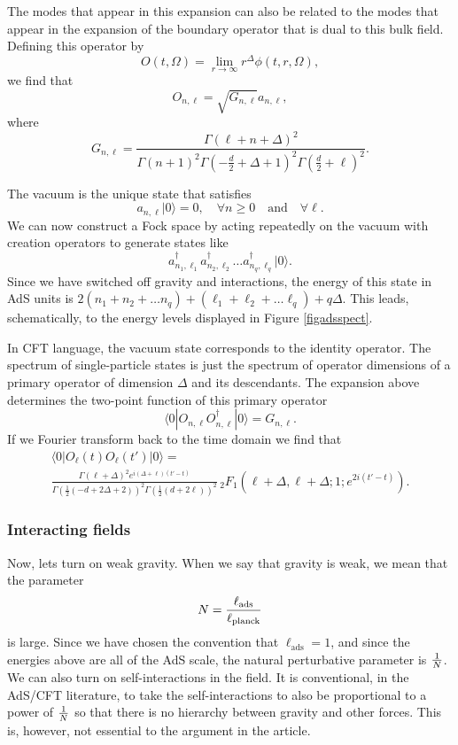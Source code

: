 \documentclass[12pt]{article}
\newcommand{\be}{\begin{equation}}
\newcommand{\ee}{\end{equation}}
\begin{document}
The modes that appear in this expansion can also be related to the modes that appear in the expansion of the boundary operator that is dual to this bulk field. Defining this operator by
\be
O(t, \Omega) = \lim_{r \rightarrow \infty} r^{\Delta} \phi(t, r, \Omega),
\ee
we find that
\be
O_{n, \ell} = \sqrt{G_{n, \ell}} a_{n, \ell},
\ee
where
\be
G_{n, \ell} = \frac{\Gamma (\ell+n+\Delta )^2}{\Gamma (n+1)^2 \Gamma \left(-\frac{d}{2}+\Delta +1\right)^2 \Gamma \left(\frac{d}{2}+\ell\right)^2}.
\ee


The vacuum is the unique state that satisfies
\be
a_{n, \ell} | 0 \rangle = 0, \quad \forall n \geq 0 \quad \text{and} \quad \forall \ell.
\ee
We can now construct a Fock space  by acting repeatedly on the vacuum
with creation operators to generate states like
\[
a_{n_1, \ell_1}^{\dagger} a_{n_2, \ell_2}^{\dagger} \ldots a_{n_q, \ell_q}^{\dagger} | 0 \rangle.
\]
Since we have switched off gravity and interactions, the energy of this state in AdS units is   $2 (n_1 + n_2 + \ldots n_q) + (\ell_1 + \ell_2 + \ldots \ell_q) + q \Delta$. This leads, schematically, to the energy levels displayed in Figure \ref{figadsspect}.

In CFT language, the vacuum state corresponds to the identity operator. The spectrum of single-particle states is just the spectrum of operator dimensions of a primary operator of dimension $\Delta$ and its descendants. The expansion above determines the two-point function of this primary operator
\be
\langle 0| O_{n, \ell} O_{n, \ell}^{\dagger} | 0 \rangle = G_{n, \ell}.
\ee
If we Fourier transform back to the time domain we find that
\begin{multline}
\langle 0| O_{\ell}(t) O_{\ell}(t') | 0 \rangle = \\
\frac{\Gamma (\ell+\Delta )^2 e^{i(\Delta +\ell)(t' - t)} }{\Gamma \left(\frac{1}{2} (-d+2 \Delta +2)\right)^2 \Gamma \left(\frac{1}{2} (d+2 \ell)\right)^2} \, _2F_1\left(\ell+\Delta ,\ell+\Delta ;1;e^{2 i (t' - t)}\right).
\end{multline}




\subsubsection*{Interacting fields }
Now, lets turn on weak gravity. When we say that gravity is weak, we mean that the parameter
\be
N = {\ell_{\text{ads}} \over \ell_{\text{planck}}}
\ee
is large. Since we have chosen the convention that $\ell_{\text{ads}} = 1$, and since the energies above are all of the AdS scale, the natural perturbative parameter is ${1 \over N}$.  We can also turn on self-interactions in the field. It is conventional, in the AdS/CFT literature, to take the self-interactions to also be proportional to a power of ${1 \over N}$ so that there is no hierarchy between gravity and other forces. This is, however, not essential to the argument in the article.
\end{document}
